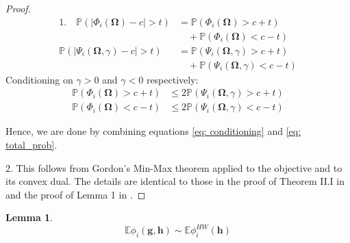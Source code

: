 \documentclass[conference]{IEEEtran}
\newcommand{\bOmega}{\bm{\Omega}}
\newcommand{\bbE}{\mathbb{E}}
\newtheorem{lemma}{Lemma}
\begin{document}
\begin{proof}
\begin{align}\label{eq: total_prob}
1. \quad \mathbb{P} \left(| \Phi_i(\bOmega) - c| > t \right) &= \mathbb{P} \left( \Phi_i(\bOmega)  > c + t \right)\nonumber \\
&\quad + \mathbb{P} \left(\Phi_i(\bOmega) < c - t \right) \nonumber \\
\mathbb{P}\left(|\Psi_i(\bOmega, \gamma) - c| > t \right) &= \mathbb{P} \left( \Psi_i(\bOmega, \gamma)  > c + t \right) \\
&\quad + \mathbb{P} \left(\Psi_i(\bOmega, \gamma) < c - t \right) \nonumber
\end{align}
Conditioning on $\gamma > 0$ and $\gamma < 0$ respectively:
\begin{align}\label{eq: conditioning}
\mathbb{P} \left( \Phi_i(\bOmega)  > c + t \right) &\leq  2 \mathbb{P}\left(\Psi_i(\bOmega, \gamma) > c + t \right) \\
\mathbb{P} \left(\Phi_i(\bOmega) < c - t \right) &\leq  2 \mathbb{P}\left(\Psi_i(\bOmega, \gamma) < c - t \right) \nonumber
\end{align}

Hence, we are done by combining equations \eqref{eq: conditioning} and \eqref{eq: total_prob}. 

2. This follows from Gordon's Min-Max theorem applied to the objective and to its convex dual. The details are identical to those in the proof of Theorem II.I in \cite{thrampoulidis2014gaussian} and the proof of Lemma 1 in \cite{akhtiamov2024novel}. 
\end{proof}

\begin{lemma}\label{lm: HW_bound}
$$\mathbb{E} \phi_i(\mathbf{g}, \mathbf{h})   \sim \bbE \phi^{HW}_i(\mathbf{h}) $$
\end{lemma}
\end{document}
